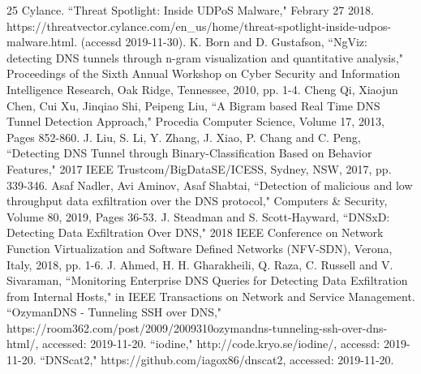 \documentclass[12pt]{jarticle} %
\begin{document}
\begin{thebibliography} {25}
  Cylance. ``Threat Spotlight: Inside UDPoS Malware," Febrary 27 2018. https://threatvector.cylance.com/en\_us/home/threat-spotlight-inside-udpos-malware.html. (accessd 2019-11-30).
  K. Born and D. Gustafson, ``NgViz: detecting DNS tunnels through n-gram visualization and quantitative analysis," Proceedings of the Sixth Annual Workshop on Cyber Security and Information Intelligence Research, Oak Ridge, Tennessee, 2010, pp. 1-4.
  Cheng Qi, Xiaojun Chen, Cui Xu, Jinqiao Shi, Peipeng Liu, ``A Bigram based Real Time DNS Tunnel Detection Approach," Procedia Computer Science, Volume 17, 2013, Pages 852-860.
  J. Liu, S. Li, Y. Zhang, J. Xiao, P. Chang and C. Peng, ``Detecting DNS Tunnel through Binary-Classification Based on Behavior Features," 2017 IEEE Trustcom/BigDataSE/ICESS, Sydney, NSW, 2017, pp. 339-346.
  Asaf Nadler, Avi Aminov, Asaf Shabtai, ``Detection of malicious and low throughput data exfiltration over the DNS protocol," Computers \& Security, Volume 80, 2019, Pages 36-53.
  J. Steadman and S. Scott-Hayward, ``DNSxD: Detecting Data Exfiltration Over DNS," 2018 IEEE Conference on Network Function Virtualization and Software Defined Networks (NFV-SDN), Verona, Italy, 2018, pp. 1-6.
  J. Ahmed, H. H. Gharakheili, Q. Raza, C. Russell and V. Sivaraman, ``Monitoring Enterprise DNS Queries for Detecting Data Exfiltration from Internal Hosts," in IEEE Transactions on Network and Service Management.
  ``OzymanDNS - Tunneling SSH over DNS," https://room362.com/post/2009/2009310ozymandns-tunneling-ssh-over-dns-html/, accessed: 2019-11-20.
  ``iodine," http://code.kryo.se/iodine/, accessd: 2019-11-20.
  ``DNScat2," https://github.com/iagox86/dnscat2, accessed: 2019-11-20.
\end{thebibliography}





\appendix
\end{document}
